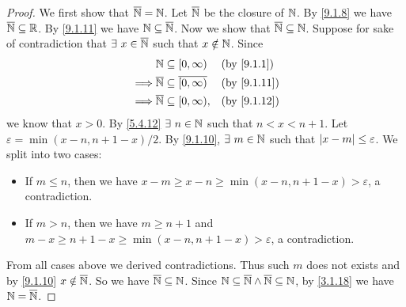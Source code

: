 \begin{proof}
  We first show that \(\overline{\mathbb{N}} = \mathbb{N}\).
  Let \(\overline{\mathbb{N}}\) be the closure of \(\mathbb{N}\).
  By \cref{9.1.8} we have \(\overline{\mathbb{N}} \subseteq \mathbb{R}\).
  By \cref{9.1.11} we have \(\mathbb{N} \subseteq \overline{\mathbb{N}}\).
  Now we show that \(\overline{\mathbb{N}} \subseteq \mathbb{N}\).
  Suppose for sake of contradiction that \(\exists\ x \in \overline{\mathbb{N}}\) such that \(x \notin \mathbb{N}\).
  Since
  \begin{align*}
             & \N \subseteq [0, \infty)                       &  & \text{(by \cref{9.1.1})}  \\
    \implies & \overline{\N} \subseteq \overline{[0, \infty)} &  & \text{(by \cref{9.1.11})} \\
    \implies & \overline{\N} \subseteq [0, \infty),           &  & \text{(by \cref{9.1.12})}
  \end{align*}
  we know that \(x > 0\).
  By \cref{5.4.12} \(\exists\ n \in \N\) such that \(n < x < n + 1\).
  Let \(\varepsilon = \min(x - n, n + 1 - x) / 2\).
  By \cref{9.1.10}, \(\exists\ m \in \mathbb{N}\) such that \(\left\lvert x - m\right\rvert \leq \varepsilon\).
  We split into two cases:
  \begin{itemize}
    \item If \(m \leq n\), then we have \(x - m \geq x - n \geq \min(x - n, n + 1 - x) > \varepsilon\), a contradiction.
    \item If \(m > n\), then we have \(m \geq n + 1\) and \(m - x \geq n + 1 - x \geq \min(x - n, n + 1 - x) > \varepsilon\), a contradiction.
  \end{itemize}
  From all cases above we derived contradictions.
  Thus such \(m\) does not exists and by \cref{9.1.10} \(x \notin \overline{\mathbb{N}}\).
  So we have \(\overline{\mathbb{N}} \subseteq \mathbb{N}\).
  Since \(\mathbb{N} \subseteq \overline{\mathbb{N}} \land \overline{\mathbb{N}} \subseteq \mathbb{N}\), by \cref{3.1.18} we have \(\mathbb{N} = \overline{\mathbb{N}}\).


\end{proof}

